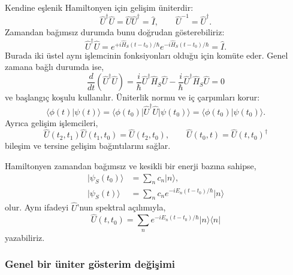 \documentclass[00_kitap.tex]{subfiles}
\begin{document}
Kendine eşlenik Hamiltonyen için gelişim üniterdir:
\begin{equation}
 \boxed{\hat U^\dagger\hat U=\hat U\hat U^\dagger=\hat I,
        \qquad \hat U^{-1}=\hat U^\dagger.}
 \label{eq:06_uniter}
\end{equation}
Zamandan bağımsız durumda bunu doğrudan gösterebiliriz:
\begin{equation}
 \hat U^\dagger\hat U
 =e^{+i\hat H_S(t-t_0)/\hbar}
  e^{-i\hat H_S(t-t_0)/\hbar}=\hat I.
\end{equation}
Burada iki üstel aynı işlemcinin fonksiyonları olduğu için komüte
eder. Genel zamana bağlı durumda ise,
\begin{equation}
 \frac{d}{dt}(\hat U^\dagger\hat U)
 =\frac{i}{\hbar}\hat U^\dagger\hat H_S\hat U
  -\frac{i}{\hbar}\hat U^\dagger\hat H_S\hat U=0
\end{equation}
ve başlangıç koşulu kullanılır. Üniterlik normu ve iç çarpımları
korur:
\begin{equation}
 \langle\phi(t)|\psi(t)\rangle
 =\langle\phi(t_0)|\hat U^\dagger\hat U|\psi(t_0)\rangle
 =\langle\phi(t_0)|\psi(t_0)\rangle.
\end{equation}
Ayrıca gelişim işlemcileri,
\begin{equation}
 \hat U(t_2,t_1)\hat U(t_1,t_0)=\hat U(t_2,t_0),\qquad
 \hat U(t_0,t)=\hat U(t,t_0)^\dagger
\end{equation}
bileşim ve tersine gelişim bağıntılarını sağlar.

Hamiltonyen zamandan bağımsız ve kesikli bir enerji bazına sahipse,
\begin{align}
 |\psi_S(t_0)\rangle&=\sum_n c_n|n\rangle,\\
 |\psi_S(t)\rangle
 &=\sum_n c_n e^{-iE_n(t-t_0)/\hbar}|n\rangle
 \label{eq:06_faz_evrimi}
\end{align}
olur. Aynı ifadeyi $\hat U$'nun spektral açılımıyla,
\begin{equation}
 \hat U(t,t_0)=\sum_n e^{-iE_n(t-t_0)/\hbar}|n\rangle\langle n|
\end{equation}
yazabiliriz.

\subsubsection{Genel bir üniter gösterim değişimi}
\end{document}
